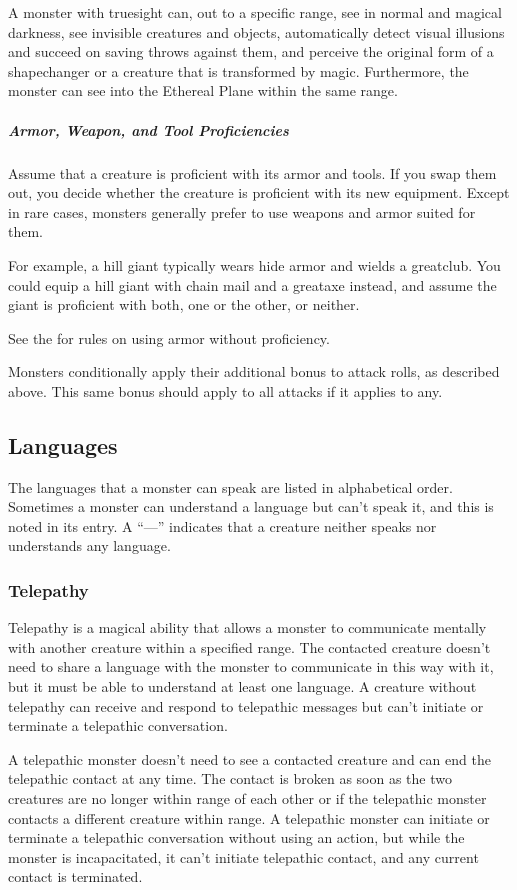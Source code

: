 A monster with truesight can, out to a specific range, see in normal and magical darkness, see invisible creatures and objects, automatically detect visual illusions and succeed on saving throws against them, and perceive the original form of a shapechanger or a creature that is transformed by magic. Furthermore, the monster can see into the Ethereal Plane within the same range.

\subparagraph*{Armor, Weapon, and Tool Proficiencies}

Assume that a creature is proficient with its armor and tools. If you swap them out, you decide whether the creature is proficient with its new equipment. Except in rare cases, monsters generally prefer to use weapons and armor suited for them.

For example, a hill giant typically wears hide armor and wields a greatclub. You could equip a hill giant with chain mail and a greataxe instead, and assume the giant is proficient with both, one or the other, or neither.

See the  for rules on using armor without proficiency.

Monsters conditionally apply their additional bonus to attack rolls, as described above. This same bonus should apply to all attacks if it applies to any.

\subsection{Languages}

The languages that a monster can speak are listed in alphabetical order. Sometimes a monster can understand a language but can't speak it, and this is noted in its entry. A “—” indicates that a creature neither speaks nor understands any language.

\subsubsection{Telepathy}

Telepathy is a magical ability that allows a monster to communicate mentally with another creature within a specified range. The contacted creature doesn't need to share a language with the monster to communicate in this way with it, but it must be able to understand at least one language. A creature without telepathy can receive and respond to telepathic messages but can't initiate or terminate a telepathic conversation.

A telepathic monster doesn't need to see a contacted creature and can end the telepathic contact at any time. The contact is broken as soon as the two creatures are no longer within range of each other or if the telepathic monster contacts a different creature within range. A telepathic monster can initiate or terminate a telepathic conversation without using an action, but while the monster is incapacitated, it can't initiate telepathic contact, and any current contact is terminated.

